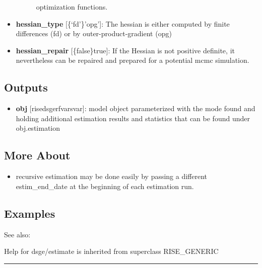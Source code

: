 \documentclass[letterpaper,10pt,english]{sphinxmanual}
\begin{document}
\begin{itemize}
\begin{description}
\begin{itemize}
\end{itemize}

optimization functions.

\end{description}

\item {} 
\textbf{hessian\_type} {[}\{`fd'\}\textbar{}'opg'{]}: The hessian is either computed by
finite differences (fd) or by outer-product-gradient (opg)

\item {} 
\textbf{hessian\_repair} {[}\{false\}\textbar{}true{]}: If the Hessian is not positive
definite, it nevertheless can be repaired and prepared for a potential
mcmc simulation.

\end{itemize}


\subsection{Outputs}
\label{classes/models/@dsge/dsge:id36}\begin{itemize}
\item {} 
\textbf{obj} {[}rise\textbar{}dsge\textbar{}rfvar\textbar{}svar{]}: model object parameterized with the
mode found and holding additional estimation results and statistics
that can be found under obj.estimation

\end{itemize}


\subsection{More About}
\label{classes/models/@dsge/dsge:id37}\begin{itemize}
\item {} 
recursive estimation may be done easily by passing a different
estim\_end\_date at the beginning of each estimation run.

\end{itemize}


\subsection{Examples}
\label{classes/models/@dsge/dsge:id38}
See also:

Help for dsge/estimate is inherited from superclass RISE\_GENERIC


\bigskip\hrule{}\bigskip
\end{document}
